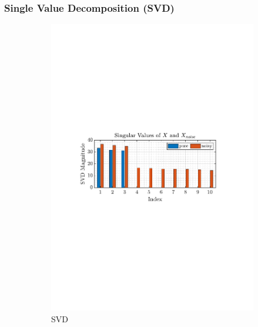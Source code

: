 \documentclass[12pt]{article}
\begin{document}
 	\subsubsection{Single Value Decomposition (SVD)}
	\begin{figure}[H]
		\centering
		\begin{subfigure}{0.49\textwidth}
			\centering
			\includegraphics[trim={2.2cm 11.2cm 3.15cm  11.2cm}, clip, width=\textwidth]{../MATLAB/figures/q1_6a_fig01.pdf} 
			\captionsetup{justification=centering}
			\caption{SVD}
		\end{subfigure}
		\begin{subfigure}{0.49\textwidth}
			\centering

\end{subfigure}
\end{figure}
\end{document}
